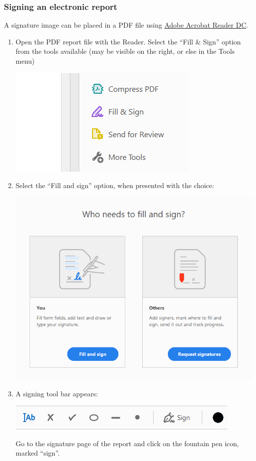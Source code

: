\subsubsection{Signing an electronic report}
A signature image can be placed in a PDF file using \href{https://acrobat.adobe.com/nz/en/acrobat/pdf-reader.html}{Adobe Acrobat Reader DC}.
\begin{enumerate}
\item Open the PDF report file with the Reader. Select the ``Fill \& Sign'' option from the tools available (may be visible on the right, or else in the Tools menu)
\begin{center}
\includegraphics[scale=1]{pictures/acrobat_signing}
\end{center}
\item Select the ``Fill and sign'' option, when presented with the choice:
\begin{center}
\includegraphics[scale=.6]{pictures/acrobat_signing_2}
\end{center}
\item A signing tool bar appears: 
\begin{center}
\includegraphics[scale=1]{pictures/acrobat_signing_3}
\end{center}
Go to the signature page of the report and click on the fountain pen icon, marked ``sign''. 


\end{enumerate}
